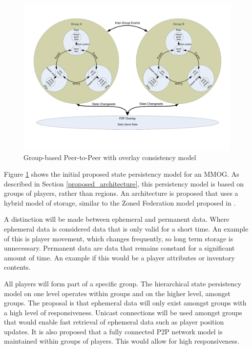 \documentclass[journal,oneside,a4paper,onecolumn]{IEEEtran}
\begin{document}
\begin{figure}[htbp]
 \centering
 \includegraphics[clip=true, viewport= 1cm 3cm 28.5cm 19cm, width=\columnwidth]{group_based_P2P_P2PO}
 \caption{Group-based Peer-to-Peer with overlay consistency model}
 \label{fig_p2p_group_o_cm}
\end{figure}
%
Figure \ref{fig_p2p_group_o_cm} shows the initial proposed state persistency model for an MMOG. As described in Section \ref{proposed_architecture}, this persistency model is based on groups of players, rather than regions. An architecture is proposed that uses a hybrid model of storage, similar to the Zoned Federation model proposed in \cite{zoned_federation}.

A distinction will be made between ephemeral and permanent data. Where ephemeral data is considered data that is only valid for a short time. An example of this is player movement, which changes frequently, so long term storage is unnecessary. Permanent data are data that remains constant for a significant amount of time. An example if this would be a player attributes or inventory contents.

All players will form part of a specific group. The hierarchical state persistency model on one level operates within groups and on the higher level, amongst groups. The proposal is that ephemeral data will only exist amongst groups with a high level of responsiveness. Unicast connections will be used amongst groups that would enable fast retrieval of ephemeral data such as player position updates. It is also proposed that a fully connected P2P network model is maintained within groups of players. This would allow for high responsiveness.
\end{document}
